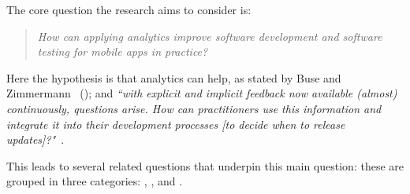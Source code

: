 The core question the research aims to consider is:
\begin{quote}
  \emph{How can applying analytics improve software development and software testing for mobile apps in practice?}~\label{overall-research-question}  
\end{quote}

Here the hypothesis is that analytics can help, as stated by Buse and Zimmermann ~(\citeyear{buse_analytics_2010}); and \emph{``with explicit and implicit feedback now available (almost) continuously, questions arise. How can practitioners use this information and integrate it into their development processes [to decide when to release updates]?"}~\citep{maalej2016_towards_data_driven_requirements_engineering}.

This leads to several related questions that underpin this main question: these are grouped in three categories: \href{sec:sources}{\textbf{}}, \href{sec:value}{\textbf{}}, and \href{sec:impact}{\textbf{}}.





